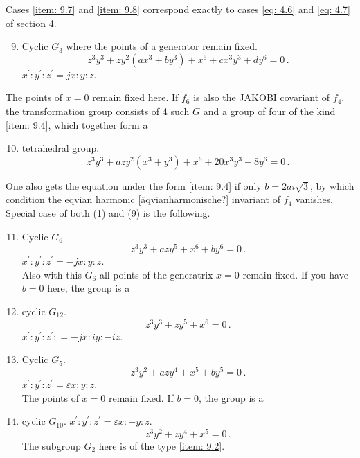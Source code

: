 \documentclass[leqno]{article}
\begin{document}
Cases \ref{item: 9.7} and \ref{item: 9.8} correspond exactly to cases \eqref{eq: 4.6} and \eqref{eq: 4.7} of section 4.
\begin{enumerate}[label=\arabic*)]
    \setcounter{enumi}{8}
    \item \label{item: 9.9}Cyclic $G_3$ where the points of a generator remain fixed.
    \begin{equation}\label{eq: 9.9}
        z^3 y^3 + z y^2 (ax^3 + by^3) + x^6 + c x^3 y^3 + d y^6 = 0 \, . \tag{9}
    \end{equation}
    $x^\prime : y^\prime : z^\prime = jx : y : z$. 
\end{enumerate}
The points of $x=0$ remain fixed here. If $f_6$ is also the JAKOBI covariant of $f_4$, the transformation group consists of 4 such $G$ and a group of four of the kind \ref{item: 9.4}, which together form a
\begin{enumerate}[label=\arabic*)]
    \setcounter{enumi}{9}
    \item \label{item: 9.10}tetrahedral group. 
    \begin{equation}\label{eq: 9.10}
        z^3 y^3 + a z y^2(x^3 + y^3) + x^6 + 20x^3 y^3-8y^6 = 0 \, . \tag{10}
    \end{equation}
\end{enumerate}
One also gets the equation under the form \ref{item: 9.4} if only $b=2ai\sqrt{3}$, by which condition the eqvian harmonic [\"aqvianharmonische?] invariant of $f_4$ vanishes. Special case of both (1) and (9) is the following.
\begin{enumerate}[label=\arabic*)]
    \setcounter{enumi}{10}
    \item \label{item: 9.11}Cyclic $G_6$
    \begin{equation}\label{eq: 9.11}
        z^3 y^3 + a z y^5 + x^6 + b y^6 = 0 \, . \tag{11}
    \end{equation}
    $x^\prime : y^\prime : z^\prime = -jx : y: z$. \\
     Also with this $G_6$ all points of the generatrix $x=0$ remain fixed. If you have $b=0$ here, the group is a 
	\item cyclic $G_{12}$.
	\begin{equation}\label{eq: 9.12}
	z^3 y^3 + zy^5 + x^6 = 0 \, . \tag{12}
	\end{equation}
	$x^\prime : y^\prime : z^\prime: = -jx : iy : -iz$. 
	\item Cyclic $G_5$.
	\begin{equation}\label{eq: 9.13}
	z^3 y^2 + azy^4 + x^5 + by^5 = 0 \, . \tag{13}
	\end{equation}
	$x^\prime : y^\prime : z^\prime = \varepsilon x : y: z$. \\
	The points of $x=0$ remain fixed. If $b=0$, the group is a 
	\item cyclic $G_{10}$. $x^\prime : y^\prime : z^\prime = \varepsilon x : -y : z$. 
	\begin{equation}\label{eq: 9.14}
	z^3 y^2 + zy^4 + x^5 = 0 \, . \tag{14}
	\end{equation}
	The subgroup $G_2$ here is of the type \ref{item: 9.2}. 
\end{enumerate}
\end{document}
